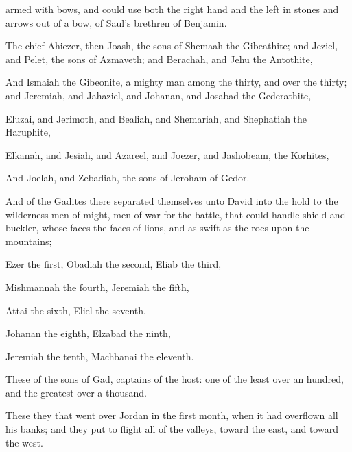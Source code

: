 {
armed with
bows, and could use both the right
hand and the
left in
{}
stones and
{}
arrows out of a
bow,
{} of
Saul’s
brethren of
Benjamin.

The
chief
{}
Ahiezer, then
Joash, the
sons of
Shemaah the
Gibeathite; and
Jeziel, and
Pelet, the
sons of
Azmaveth; and
Berachah, and
Jehu the
Antothite,

And
Ismaiah the
Gibeonite, a mighty
man among the
thirty, and over the
thirty; and
Jeremiah, and
Jahaziel, and
Johanan, and
Josabad the
Gederathite,

Eluzai, and
Jerimoth, and
Bealiah, and
Shemariah, and
Shephatiah the
Haruphite,

Elkanah, and
Jesiah, and
Azareel, and
Joezer, and
Jashobeam, the
Korhites,

And
Joelah, and
Zebadiah, the
sons of
Jeroham of
Gedor.

And of the
Gadites there
separated themselves unto
David into the
hold to the
wilderness
men of
might,
{}
men of
war
{} for the
battle, that could
handle
shield and
buckler, whose
faces
{} the
faces of
lions, and
{} as
swift as the
roes upon the
mountains;

Ezer the
first,
Obadiah the
second,
Eliab the
third,

Mishmannah the
fourth,
Jeremiah the
fifth,

Attai the
sixth,
Eliel the
seventh,

Johanan the
eighth,
Elzabad the
ninth,

Jeremiah the
tenth,
Machbanai the
eleventh.

These
{} of the
sons of
Gad,
captains of the
host:
one of the
least
{} over an
hundred, and the
greatest over a
thousand.

These
{} they that went
over
Jordan in the
first
month, when it had
overflown all his
banks; and they put to
flight all
{} of the
valleys,
{} toward the
east, and toward the
west.

}
